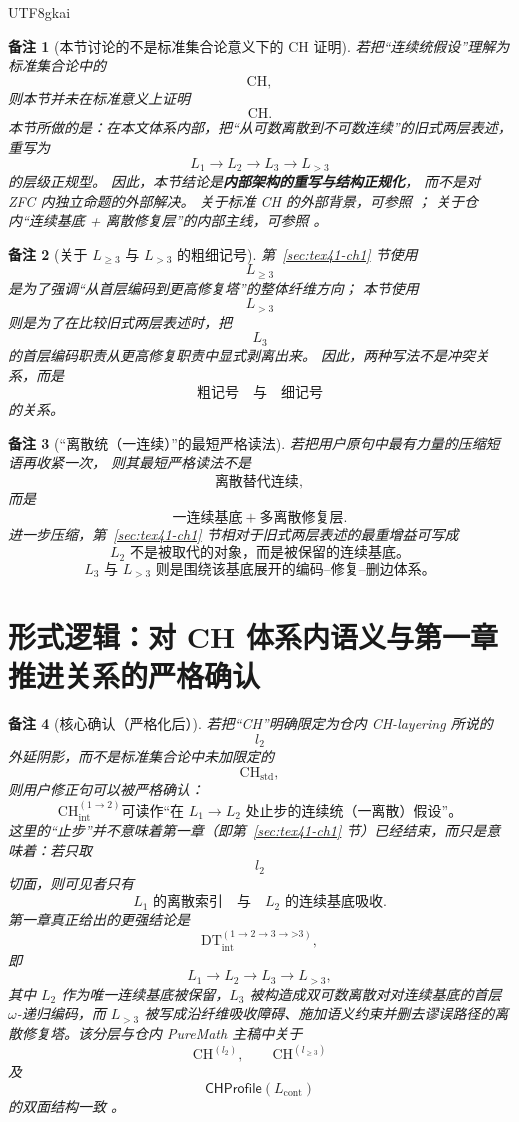\documentclass[12pt]{article}
\newtheorem{remark}{备注}[section]
\newcommand{\CHstd}{\mathrm{CH}_{\mathrm{std}}}
\newcommand{\CHint}{\mathrm{CH}_{\mathrm{int}}}
\newcommand{\DTint}{\mathrm{DT}_{\mathrm{int}}}
\newcommand{\CHProfileOp}{\mathsf{CHProfile}}
\begin{document}
\begin{CJK*}{UTF8}{gkai}
\begin{remark}[本节讨论的不是标准集合论意义下的 CH 证明]
若把“连续统假设”理解为标准集合论中的
\[
  \mathrm{CH},
\]
则本节并未在标准意义上证明
\[
  \mathrm{CH}.
\]
本节所做的是：在本文体系内部，把“从可数离散到不可数连续”的旧式两层表述，重写为
\[
  L_1\to L_2\to L_3\to L_{>3}
\]
的层级正规型。
因此，本节结论是\textbf{内部架构的重写与结构正规化}，
而不是对 ZFC 内独立命题的外部解决。
关于标准 CH 的外部背景，可参照
\cite{Jech2003SetTheory}；
关于仓内“连续基底 + 离散修复层”的内部主线，可参照
\cite{GaoZheng2025GFramework,GaoZhengAppVol1,RepoAppMathVol4Tex}。
\end{remark}

\begin{remark}[关于 $L_{\ge 3}$ 与 $L_{>3}$ 的粗细记号]
第~\ref{sec:tex41-ch1} 节使用
\[
  L_{\ge 3}
\]
是为了强调“从首层编码到更高修复塔”的整体纤维方向；
本节使用
\[
  L_{>3}
\]
则是为了在比较旧式两层表述时，把
\[
  L_3
\]
的首层编码职责从更高修复职责中显式剥离出来。
因此，两种写法不是冲突关系，而是
\[
  \text{粗记号}
  \quad\text{与}\quad
  \text{细记号}
\]
的关系。
\end{remark}

\begin{remark}[“离散统（一连续）”的最短严格读法]
若把用户原句中最有力量的压缩短语再收紧一次，
则其最短严格读法不是
\[
  \text{离散替代连续},
\]
而是
\[
  \text{一连续基底}
  +
  \text{多离散修复层}.
\]
进一步压缩，第~\ref{sec:tex41-ch1} 节相对于旧式两层表述的最重增益可写成
\[
\boxed{
  L_2\text{ 不是被取代的对象，而是被保留的连续基底。}
}
\]
\[
\boxed{
  L_3\text{ 与 }L_{>3}\text{ 则是围绕该基底展开的编码--修复--删边体系。}
}
\]
\end{remark}

\section{形式逻辑：对 CH 体系内语义与第一章推进关系的严格确认}
\label{sec:tex41-ch-confirmation}

\begin{remark}[核心确认（严格化后）]
若把“CH”明确限定为仓内 CH-layering 所说的
\[
  l_2
\]
外延阴影，而不是标准集合论中未加限定的
\[
  \CHstd,
\]
则用户修正句可以被严格确认：
\[
\boxed{
  \CHint^{(1\to2)}
  \text{可读作“在 }L_1\to L_2\text{ 处止步的连续统（一离散）假设”。}
}
\]
这里的“止步”并不意味着第一章（即第~\ref{sec:tex41-ch1} 节）已经结束，而只是意味着：若只取
\[
  l_2
\]
切面，则可见者只有
\[
  L_1\text{ 的离散索引}
  \quad\text{与}\quad
  L_2\text{ 的连续基底吸收}.
\]
第一章真正给出的更强结论是
\[
\boxed{
  \DTint^{(1\to2\to3\to\text{>3})},
}
\]
即
\[
  L_1\to L_2\to L_3\to L_{>3},
\]
其中 $L_2$ 作为唯一连续基底被保留，$L_3$ 被构造成双可数离散对对连续基底的首层 $\omega$-递归编码，而 $L_{>3}$ 被写成沿纤维吸收障碍、施加语义约束并删去谬误路径的离散修复塔。该分层与仓内 PureMath
  主稿中关于
\[
  \mathrm{CH}^{(l_2)},\qquad \mathrm{CH}^{(l_{\ge3})}
\]
及
\[
  \CHProfileOp(L_{\mathrm{cont}})
\]
的双面结构一致
\cite{GaoZheng2025GFramework,GaoZhengAppVol1,RepoAppMathVol4Tex}。
\end{remark}


\end{CJK*}
\end{document}
